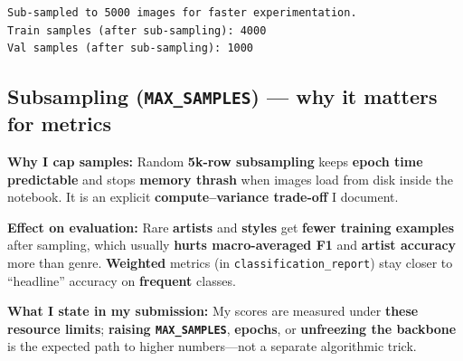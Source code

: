 \documentclass[11pt]{article}
\begin{document}
    \begin{Verbatim}[commandchars=\\\{\}]
Sub-sampled to 5000 images for faster experimentation.
Train samples (after sub-sampling): 4000
Val samples (after sub-sampling): 1000
    \end{Verbatim}

    \subsection{\texorpdfstring{Subsampling (\texttt{MAX\_SAMPLES}) --- why
it matters for
metrics}{Subsampling (MAX\_SAMPLES) --- why it matters for metrics}}\label{subsampling-max_samples-why-it-matters-for-metrics}

\textbf{Why I cap samples:} Random \textbf{5k-row subsampling} keeps
\textbf{epoch time predictable} and stops \textbf{memory thrash} when
images load from disk inside the notebook. It is an explicit
\textbf{compute--variance trade-off} I document.

\textbf{Effect on evaluation:} Rare \textbf{artists} and \textbf{styles}
get \textbf{fewer training examples} after sampling, which usually
\textbf{hurts macro-averaged F1} and \textbf{artist accuracy} more than
genre. \textbf{Weighted} metrics (in \texttt{classification\_report})
stay closer to ``headline'' accuracy on \textbf{frequent} classes.

\textbf{What I state in my submission:} My scores are measured under
\textbf{these resource limits}; \textbf{raising \texttt{MAX\_SAMPLES}},
\textbf{epochs}, or \textbf{unfreezing the backbone} is the expected
path to higher numbers---not a separate algorithmic trick.
\end{document}
